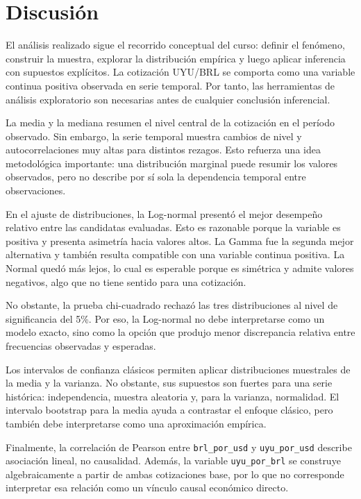 \section{Discusión}

El análisis realizado sigue el recorrido conceptual del curso: definir el fenómeno, construir la muestra, explorar la distribución empírica y luego aplicar inferencia con supuestos explícitos. La cotización UYU/BRL se comporta como una variable continua positiva observada en serie temporal. Por tanto, las herramientas de análisis exploratorio son necesarias antes de cualquier conclusión inferencial.

La media \MediaCambio{} y la mediana \MedianaCambio{} resumen el nivel central de la cotización en el período observado. Sin embargo, la serie temporal muestra cambios de nivel y autocorrelaciones muy altas para distintos rezagos. Esto refuerza una idea metodológica importante: una distribución marginal puede resumir los valores observados, pero no describe por sí sola la dependencia temporal entre observaciones.

En el ajuste de distribuciones, la Log-normal presentó el mejor desempeño relativo entre las candidatas evaluadas. Esto es razonable porque la variable es positiva y presenta asimetría hacia valores altos. La Gamma fue la segunda mejor alternativa y también resulta compatible con una variable continua positiva. La Normal quedó más lejos, lo cual es esperable porque es simétrica y admite valores negativos, algo que no tiene sentido para una cotización.

No obstante, la prueba chi-cuadrado rechazó las tres distribuciones al nivel de significancia del 5\%. Por eso, la Log-normal no debe interpretarse como un modelo exacto, sino como la opción que produjo menor discrepancia relativa entre frecuencias observadas y esperadas.

Los intervalos de confianza clásicos permiten aplicar distribuciones muestrales de la media y la varianza. No obstante, sus supuestos son fuertes para una serie histórica: independencia, muestra aleatoria y, para la varianza, normalidad. El intervalo bootstrap para la media ayuda a contrastar el enfoque clásico, pero también debe interpretarse como una aproximación empírica.

Finalmente, la correlación de Pearson entre \texttt{brl\_por\_usd} y \texttt{uyu\_por\_usd} describe asociación lineal, no causalidad. Además, la variable \texttt{uyu\_por\_brl} se construye algebraicamente a partir de ambas cotizaciones base, por lo que no corresponde interpretar esa relación como un vínculo causal económico directo.

